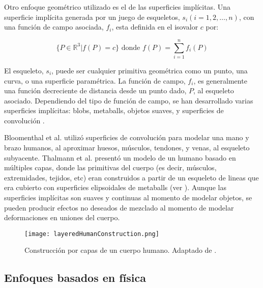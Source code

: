 Otro enfoque geométrico utilizado es el de las superficies implícitas. Una superficie implícita generada por un juego de esqueletos, $ s_i (i=1,2,\dots,n)$, con una función de campo asociada, $ f_i$, esta definida en el isovalor $c$ por:

\begin{equation}
	\{P\in\mathbb{R}^3 | f(P) = c \}  \text{  donde  }  f(P) = \sum_{i=1}^{n} f_i(P)
\end{equation}

El esqueleto, $s_i$, puede ser cualquier primitiva geométrica como un punto, una curva, o una superficie paramétrica. La función de campo, $f_i$, es generalmente una función decreciente de distancia desde un punto dado, $P$, al esqueleto asociado. Dependiendo del tipo de función de campo, se han desarrollado varias superficies implícitas: blobs, metaballs, objetos suaves, y superficies de convolución \citep{blinn1982generalization, wyvill1988field, bloomenthal1991convolution}.

Bloomenthal et al. \citep{bloomenthal1991convolution} utilizó superficies de convolución para modelar una mano y brazo humanos, al aproximar huesos, músculos, tendones, y venas, al esqueleto subyacente. Thalmann et al. \citep{thalmann1996fast} presentó un modelo de un humano basado en múltiples capas, donde las primitivas del cuerpo (es decir, músculos, extremidades, tejidos, etc) eran construidos a partir de un esqueleto de lineas que era cubierto con superficies elipsoidales de metaballs (ver ). Aunque las superficies implícitas son suaves y continuas  al momento de modelar objetos, se pueden producir efectos no deseados de mezclado al momento de modelar deformaciones en uniones del cuerpo. 

\begin{figure}
	\centering
		\texttt{[image: layeredHumanConstruction.png]}
		\caption[Construcción por capas de un cuerpo humano.]{Construcción por capas de un cuerpo humano. Adaptado de \citep{thalmann1996fast}.}
		\label{fig:layeredHumanConstruction}
\end{figure}

\subsection{Enfoques basados en física}

